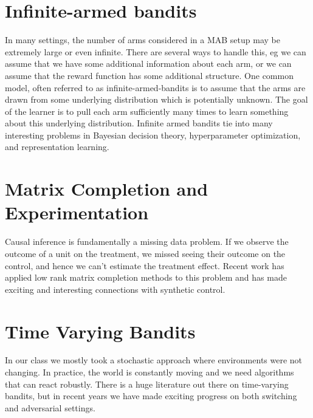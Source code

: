 \documentclass[11pt]{article}
\newcommand{\1}[1]{\mathbf{1}\left\{#1\right\}}
\begin{document}
\section{Infinite-armed bandits}
\begin{refsection}
In many settings, the number of arms considered in a MAB setup may be extremely large or even infinite. There are several ways to handle this, eg we can assume that we have some additional information about each arm, or we can assume that the reward function has some additional structure. One common model, often referred to as infinite-armed-bandits is to assume that the arms are drawn from some underlying distribution which is potentially unknown. The goal of the learner is to pull each arm sufficiently many times to learn something about this underlying distribution. Infinite armed bandits tie into many interesting problems in Bayesian decision theory, hyperparameter optimization, and representation learning.


\nocite{chan2019optimal, jain2018firing, kalvit2020finite, berry1997bandit, wang2022beyond, carpentier2015simple, wang2008algorithms, li2017hyperband, bayati2020unreasonable}
\printbibliography[heading=subbibliography]
\end{refsection}


\section{Matrix Completion and Experimentation}
\begin{refsection}
    
Causal inference is fundamentally a missing data problem. If we observe the outcome of a unit on the treatment, we missed seeing their outcome on the control, and hence we can't estimate the treatment effect. Recent work has applied low rank matrix completion methods to this problem and has made exciting and interesting connections with synthetic control.

\nocite{athey2021matrix, arkhangelsky2021synthetic, farias2021learning, agarwal2021causal, dwivedi2022counterfactual}
\printbibliography[heading=subbibliography]
\end{refsection}


\section{Time Varying Bandits}
\begin{refsection}

In our class we mostly took a stochastic approach where environments were not changing. In practice, the world is constantly moving and we need algorithms that can react robustly. There is a huge literature out there on time-varying bandits, but in recent years we have made exciting progress on both switching and adversarial settings. 

\nocite{qin2022adaptivity, zimmert2021tsallis, suk2021tracking, auer2019achieving, abbasi2018best}
\printbibliography[heading=subbibliography]
\end{refsection}
\end{document}
